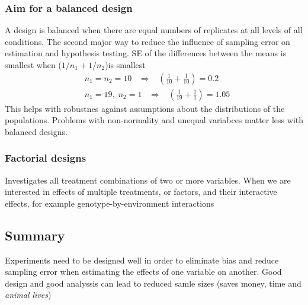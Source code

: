 \documentclass{article}
\begin{document}
\subsubsection{Aim for a balanced design}
A design is balanced when there are equal numbers of replicates at all levels of all conditions. The second major way to reduce the influence of sampling error on estimation and hypothesis testing. SE of the differences between the means is smallest when ($1/n_1 + 1/n_2$)is smallest
\begin{equation*}
\begin{split}
& n_1 = n_2 = 10 \;\;\; \Rightarrow \;\;\; ( \frac{1}{10} +\frac{1}{10} ) = 0.2 \\
& n_1 = 19,\; n_2 = 1 \;\;\; \Rightarrow \;\;\;(\frac{1}{19} + \frac{1}{1})= 1.05
\end{split}
\end{equation*}
This helps with robustnes against assumptions about the distributions of the populations. Problems with non-normality and unequal variabces matter less with balanced designs.


\subsubsection{Factorial designs}
Investigates all treatment combinations of two or more variables. When we are interested in effects of multiple treatments, or factors, and their interactive effects, for example genotype-by-environment interactions

\subsection{Summary}
Experiments need to be designed well in order to eliminate bias and reduce sampling error when estimating the effects of one variable on another. Good design and good analyssis can lead to reduced samle sizes (saves money, time and \textit{animal lives})
\end{document}
